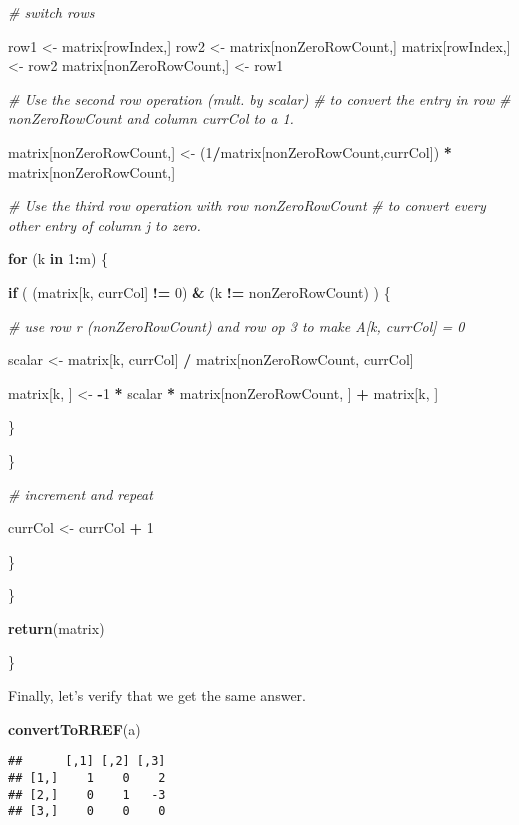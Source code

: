 \documentclass[]{article}
\newenvironment{Shaded}{\begin{snugshade}}{\end{snugshade}}
\newcommand{\KeywordTok}[1]{\textcolor[rgb]{0.13,0.29,0.53}{\textbf{#1}}}
\newcommand{\DecValTok}[1]{\textcolor[rgb]{0.00,0.00,0.81}{#1}}
\newcommand{\StringTok}[1]{\textcolor[rgb]{0.31,0.60,0.02}{#1}}
\newcommand{\CommentTok}[1]{\textcolor[rgb]{0.56,0.35,0.01}{\textit{#1}}}
\newcommand{\ControlFlowTok}[1]{\textcolor[rgb]{0.13,0.29,0.53}{\textbf{#1}}}
\newcommand{\OperatorTok}[1]{\textcolor[rgb]{0.81,0.36,0.00}{\textbf{#1}}}
\newcommand{\NormalTok}[1]{#1}
\begin{document}
\begin{Shaded}
\begin{Highlighting}[]
      \CommentTok{# switch rows}
      
\NormalTok{      row1 <-}\StringTok{ }\NormalTok{matrix[rowIndex,]}
\NormalTok{      row2 <-}\StringTok{ }\NormalTok{matrix[nonZeroRowCount,]}
\NormalTok{      matrix[rowIndex,] <-}\StringTok{ }\NormalTok{row2}
\NormalTok{      matrix[nonZeroRowCount,] <-}\StringTok{ }\NormalTok{row1}
      
      \CommentTok{# Use the second row operation (mult. by scalar) }
      \CommentTok{# to convert the entry in row }
      \CommentTok{# nonZeroRowCount and column currCol to a 1.}
      
\NormalTok{      matrix[nonZeroRowCount,] <-}\StringTok{ }\NormalTok{(}\DecValTok{1}\OperatorTok{/}\NormalTok{matrix[nonZeroRowCount,currCol]) }\OperatorTok{*}\StringTok{ }\NormalTok{matrix[nonZeroRowCount,]}

      \CommentTok{# Use the third row operation with row nonZeroRowCount}
      \CommentTok{# to convert every other entry of column j to zero.}
      
      \ControlFlowTok{for}\NormalTok{ (k }\ControlFlowTok{in} \DecValTok{1}\OperatorTok{:}\NormalTok{m) \{}
        
        \ControlFlowTok{if}\NormalTok{ ( (matrix[k, currCol] }\OperatorTok{!=}\StringTok{ }\DecValTok{0}\NormalTok{) }\OperatorTok{&}\StringTok{ }\NormalTok{(k }\OperatorTok{!=}\StringTok{ }\NormalTok{nonZeroRowCount) ) \{}
          
          \CommentTok{# use row r (nonZeroRowCount) and row op 3 to make A[k, currCol] = 0}
          
\NormalTok{          scalar <-}\StringTok{ }\NormalTok{matrix[k, currCol] }\OperatorTok{/}\StringTok{ }\NormalTok{matrix[nonZeroRowCount, currCol] }
          
\NormalTok{          matrix[k, ] <-}\StringTok{ }\OperatorTok{-}\DecValTok{1} \OperatorTok{*}\StringTok{ }\NormalTok{scalar }\OperatorTok{*}\StringTok{ }\NormalTok{matrix[nonZeroRowCount, ] }\OperatorTok{+}\StringTok{ }\NormalTok{matrix[k, ]}

\NormalTok{        \}}
        
\NormalTok{      \}}
      
      \CommentTok{# increment and repeat}
      
\NormalTok{      currCol <-}\StringTok{ }\NormalTok{currCol }\OperatorTok{+}\StringTok{ }\DecValTok{1}
      
\NormalTok{    \}}
        
\NormalTok{  \}}
  
  \KeywordTok{return}\NormalTok{(matrix)}
      
\NormalTok{\}}
\end{Highlighting}
\end{Shaded}

Finally, let's verify that we get the same answer.

\begin{Shaded}
\begin{Highlighting}[]
\KeywordTok{convertToRREF}\NormalTok{(a)}
\end{Highlighting}
\end{Shaded}

\begin{verbatim}
##      [,1] [,2] [,3]
## [1,]    1    0    2
## [2,]    0    1   -3
## [3,]    0    0    0
\end{verbatim}
\end{document}
